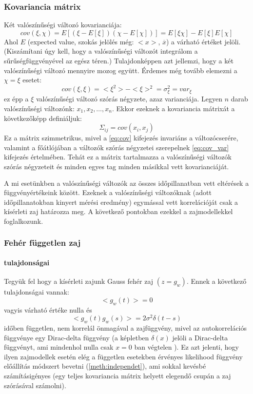 \subsubsection{Kovariancia mátrix}
Két valószínűségi változó kovarianciája:
\begin{equation}\label{eq:cov}
cov(\xi,\chi) = E\left[(\xi-E[\xi])(\chi-E[\chi])\right] = E[\xi\chi] - E[\xi]E[\chi]
\end{equation}
Ahol $E$ (expected value, szokás jelölés még: $<x>$, $\overline{x}$) a várható értéket jelöli. (Kiszámítani úgy kell, hogy a valószínűségi változót integrálom a sűrűségfüggvényével az egész téren.) Tulajdonképpen azt jellemzi, hogy a két valószínűségi változó mennyire mozog együtt. Érdemes még tovább elemezni a $\chi=\xi$ esetet:
\begin{equation}\label{eq:cov_var}
cov(\xi,\xi) = <\xi^2> - <\xi>^2 = \sigma_\xi^2 = var_\xi
\end{equation}
ez épp a $\xi$ valószínűségi változó szórás négyzete, azaz varianciája. 
Legyen $n$ darab valószínűségi változónk: $x_1, x_2, \ldots , x_n$. Ekkor ezeknek a kovariancia mátrixát a következőképp definiáljuk:
\begin{equation}\label{eq:covmat}
\Sigma_{ij} = cov(x_i, x_j)
\end{equation}
Ez a mátrix szimmetrikus, mivel a \ref{eq:cov} kifejezés invariáns a változócserére, valamint a főátlójában a változók szórás négyzetei szerepelnek \ref{eq:cov_var} kifejezés értelmében. Tehát ez a mátrix tartalmazza a valószínűségi változók szórás négyzeteit és minden egyes tag minden másikkal vett kovarianciáját.

A mi esetünkben a valószínűségi változók az összes időpillanatban vett eltérések a függvényértékeink között. Ezeknek a valószínűségi változóknak (adott időpillanatokban kinyert mérési eredmény) egymással vett korrelációját csak a kísérleti zaj határozza meg. A következő pontokban ezekkel a zajmodellekkel foglalkozunk.

\subsubsection{Fehér független zaj}
\paragraph{tulajdonságai}
Tegyük fel hogy a kísérleti zajunk Gauss fehér zaj $(z = g_w)$. Ennek a következő tulajdonságai vannak:
\begin{equation}
<g_w(t)> = 0
\end{equation}
vagyis várható értéke nulla és
\begin{equation}
<g_w(t)g_w(s)> = 2\sigma^2\delta(t-s)
\end{equation}
időben független, nem korrelál önmagával a zajfüggvény, mivel az autokorrelációs függvénye egy Dirac-delta függvény (a képletben $\delta(x)$ jelöli a Dirac-delta függvényt, ami mindenhol nulla csak $x=0$ ban végtelen ). Ez azt jelenti, hogy ilyen zajmodellek esetén elég a független esetekben érvényes likelihood függvény előállítás módszert bevetni (\ref{meth:independet}), ami sokkal kevésbé számításigényes (egy teljes kovariancia mátrix helyett elegendő csupán a zaj szórásával számolni).

